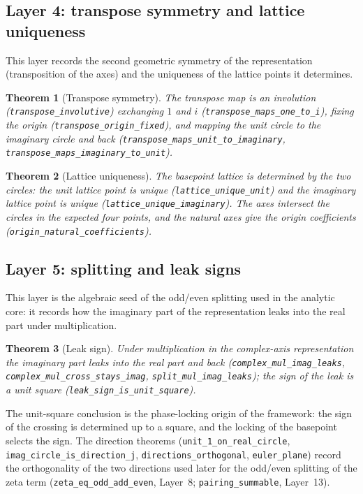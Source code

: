 \documentclass{article}
\newtheorem{theorem}{Theorem}[section]
\begin{document}
\subsection{Layer 4: transpose symmetry and lattice uniqueness}
\label{sec:L4}

This layer records the second geometric symmetry of the representation
(transposition of the axes) and the uniqueness of the lattice points it
determines.

\begin{theorem}[Transpose symmetry]
\label{thm:transpose}
The transpose map is an involution (\texttt{transpose\_involutive})
exchanging $1$ and $i$ (\texttt{transpose\_maps\_one\_to\_i}), fixing the
origin (\texttt{transpose\_origin\_fixed}), and mapping the unit circle to
the imaginary circle and back
(\texttt{transpose\_maps\_unit\_to\_imaginary},
\texttt{transpose\_maps\_imaginary\_to\_unit}).
\end{theorem}

\begin{theorem}[Lattice uniqueness]
\label{thm:lattice}
The basepoint lattice is determined by the two circles:
the unit lattice point is unique (\texttt{lattice\_unique\_unit}) and the
imaginary lattice point is unique (\texttt{lattice\_unique\_imaginary}).
The axes intersect the circles in the expected four points, and the natural
axes give the origin coefficients
(\texttt{origin\_natural\_coefficients}).
\end{theorem}

\subsection{Layer 5: splitting and leak signs}
\label{sec:L5}

This layer is the algebraic seed of the odd/even splitting used in the
analytic core: it records how the imaginary part of the representation
leaks into the real part under multiplication.

\begin{theorem}[Leak sign]
\label{thm:leak}
Under multiplication in the complex-axis representation the imaginary part
leaks into the real part and back
(\texttt{complex\_mul\_imag\_leaks},
\texttt{complex\_mul\_cross\_stays\_imag},
\texttt{split\_mul\_imag\_leaks}); the sign of the leak is a unit square
(\texttt{leak\_sign\_is\_unit\_square}).
\end{theorem}

The unit-square conclusion is the phase-locking origin of the framework: the
sign of the crossing is determined up to a square, and the locking of the
basepoint selects the sign. The direction theorems
(\texttt{unit\_1\_on\_real\_circle}, \texttt{imag\_circle\_is\_direction\_j},
\texttt{directions\_orthogonal}, \texttt{euler\_plane}) record the
orthogonality of the two directions used later for the odd/even splitting of
the zeta term (\texttt{zeta\_eq\_odd\_add\_even}, Layer~8;
\texttt{pairing\_summable}, Layer~13).
\end{document}
